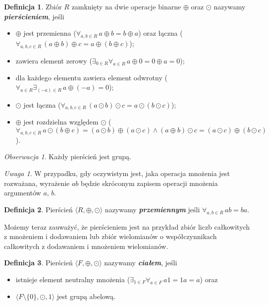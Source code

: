 \documentclass[declaration,shortabstract]{iithesis}
\theoremstyle{definition}
\newtheorem{definition}{Definicja}
\theoremstyle{remark} \newtheorem{observation}{Obserwacja}
\theoremstyle{plain} \newtheorem{theorem}{Twierdzenie}
\theoremstyle{plain} \newtheorem{lemma}{Lemat}
\theoremstyle{remark} \newtheorem*{remark*}{Uwaga}
\theoremstyle{reminder} \newtheorem*{reminder*}{Przypomnienie}
\begin{document}
\theoremstyle{definition} 
\begin{definition}
	Zbiór $R$ zamknięty na dwie operacje binarne $\oplus$ oraz $\odot$ nazywamy \textit{\textbf{pierścieniem}}, jeśli 
	\begin{itemize}[leftmargin=.4in]
		\item $\oplus$ jest przemienna ($\forall_{a, b \in R} \, a \oplus b = b \oplus a$) oraz łączna ($\forall_{a, b, c \in R} \, (a \oplus b) \oplus c = a \oplus (b \oplus c)$);
		\item zawiera element zerowy ($\exists_{0 \in R} \forall_{a \in R} \, a \oplus 0 = 0 \oplus a = 0$);
		\item dla każdego elementu zawiera element odwrotny ($\forall_{a \in R} \exists_{(-a) \in R} \, a \oplus (-a) = 0$);
		\item $\odot$ jest łączna ($\forall_{a, b, c \in R} \, (a \odot b) \odot c = a \odot (b \odot c)$);
		\item $\oplus$ jest rozdzielna względem $\odot$ ($\forall_{a, b, c \in R} \, a \odot (b \oplus c) = (a \odot b) \oplus (a \odot c) \wedge (a \oplus b) \odot c = (a \odot c) \oplus (b \odot c)$).
	\end{itemize}
\end{definition}

\theoremstyle{observation}
\begin{observation}
	Każdy pierścień jest grupą.
\end{observation}

\begin{remark*}
	W przypadku, gdy oczywistym jest, jaka operacja mnożenia jest rozważana, wyrażenie $ab$ będzie skróconym zapisem operacji mnożenia argumentów $a, \,b$.
\end{remark*}

\theoremstyle{definition}
\begin{definition}
	Pierścień $\langle R, \oplus, \odot \rangle$ nazywamy \textit{\textbf{przemiennym}} jeśli $\forall_{a, b \in R} \, ab = ba$.
\end{definition}

Możemy teraz zauważyć, że pierścieniem jest na przykład zbiór liczb całkowitych z mnożeniem i dodawaniem lub zbiór wielomianów o współczynnikach całkowitych z dodawaniem i mnożeniem wielomianów.

\theoremstyle{definition} 
\begin{definition} \label{cialo}
	Pierścień $\langle F, \oplus, \odot \rangle$ nazywamy \textit{\textbf{ciałem}}, jeśli 
	\begin{itemize}[leftmargin=.4in]
		\item istnieje element neutralny mnożenia ($\exists_{1 \in F} \forall_{a \in F} \, a1 = 1a = a$) oraz
		\item $\langle F \setminus \{0\}, \odot, 1 \rangle$ jest grupą abelową.
	\end{itemize}
\end{definition}
\end{document}
